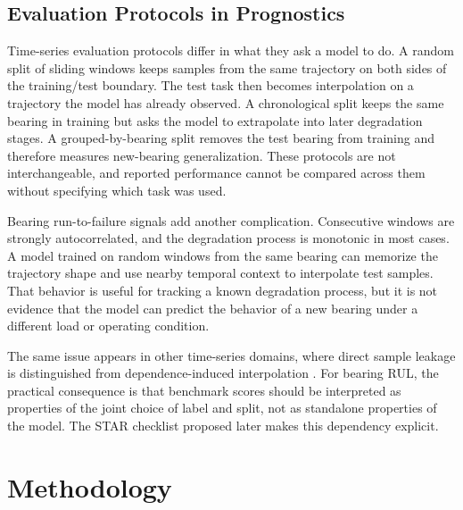 \documentclass[pdflatex,sn-mathphys-num]{sn-jnl}
\begin{document}
\subsection{Evaluation Protocols in Prognostics}
Time-series evaluation protocols differ in what they ask a model to do. A random split of sliding windows keeps samples from the same trajectory on both sides of the training/test boundary. The test task then becomes interpolation on a trajectory the model has already observed. A chronological split keeps the same bearing in training but asks the model to extrapolate into later degradation stages. A grouped-by-bearing split removes the test bearing from training and therefore measures new-bearing generalization. These protocols are not interchangeable, and reported performance cannot be compared across them without specifying which task was used.

Bearing run-to-failure signals add another complication. Consecutive windows are strongly autocorrelated, and the degradation process is monotonic in most cases. A model trained on random windows from the same bearing can memorize the trajectory shape and use nearby temporal context to interpolate test samples. That behavior is useful for tracking a known degradation process, but it is not evidence that the model can predict the behavior of a new bearing under a different load or operating condition.

The same issue appears in other time-series domains, where direct sample leakage is distinguished from dependence-induced interpolation \cite{leakage_nature,leakage_frontiers}. For bearing RUL, the practical consequence is that benchmark scores should be interpreted as properties of the joint choice of label and split, not as standalone properties of the model. The STAR checklist proposed later makes this dependency explicit.

\section{Methodology}
\end{document}
